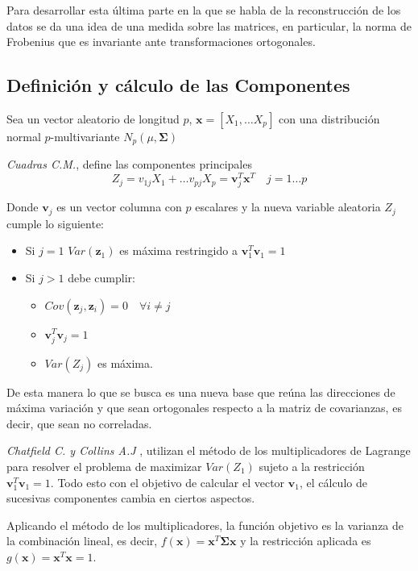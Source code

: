 \noindent Para desarrollar esta última parte en la que se habla de la reconstrucción de los datos se da una idea de una medida sobre las matrices, en particular, la norma de Frobenius que es invariante ante transformaciones ortogonales. 

\newpage
\subsection{Definición y cálculo de las Componentes}

\noindent Sea un vector aleatorio de longitud $p$, $\mathbf{x}=[X_1,\ldots X_p]$ con una distribución normal $p$-multivariante $N_p(\mu,\mathbf{\Sigma})$
\begin{defi}
\emph{Cuadras C.M.},\cite{Cuadras 2014} define las componentes principales 
\begin{equation}
Z_j=v_{1j}X_1+\ldots v_{pj}X_p=\mathbf{v}_j^T\mathbf{x}^T \quad j=1\ldots p
\end{equation}

\noindent Donde $\textbf{v}_j$ es un vector columna con $p$ escalares y la nueva variable aleatoria $Z_j$ cumple lo siguiente:
\begin{itemize}
\item Si $j=1$ $Var(\mathbf{z}_1)$ es máxima restringido a $\mathbf{v}_1^T \mathbf{v}_1=1$
\item Si $j>1$ debe cumplir:
\begin{itemize}
\item $Cov(\textbf{z}_j,\textbf{z}_i)=0\quad \forall i\neq j $
\item $\textbf{v}_j^T \textbf{v}_j=1$
\item $Var(Z_j)$ es máxima. 
\end{itemize}
\end{itemize}
\noindent De esta manera lo que se busca es una nueva base que reúna las direcciones de máxima variación y que sean ortogonales respecto a la matriz de covarianzas, es decir, que sean no correladas.
\end{defi}

\noindent \emph{Chatfield C. y Collins A.J} \cite{Chatfield 1989}, utilizan el método de los multiplicadores de Lagrange para resolver el problema de maximizar  $Var(Z_1)$ sujeto a la restricción $\textbf{v}_1^T\textbf{v}_1=1$. Todo esto con el objetivo de calcular el vector $\mathbf{v}_1$, el cálculo de sucesivas componentes cambia en ciertos aspectos. 

\noindent Aplicando el método de los multiplicadores, la función objetivo es la varianza de la combinación lineal, es decir, $f(\mathbf{x})=\mathbf{x}^T \mathbf{\Sigma} \mathbf{x}$ y la restricción aplicada es $g(\textbf{x})=\textbf{x}^T\textbf{x}=1$. 

